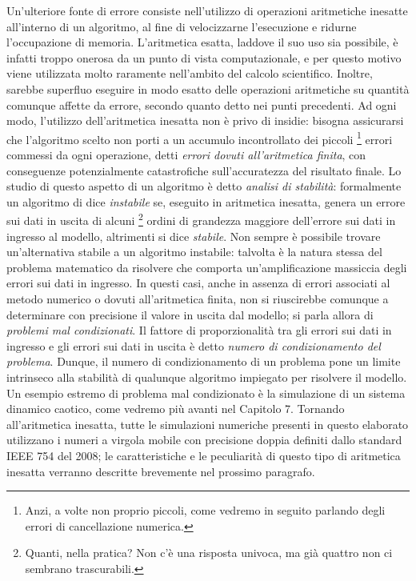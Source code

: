 Un'ulteriore fonte di errore consiste nell'utilizzo di operazioni
aritmetiche inesatte all'interno di un algoritmo, al fine di velocizzarne
l'esecuzione e ridurne l'occupazione di memoria.
L'aritmetica esatta, laddove il suo uso sia possibile,
è infatti troppo onerosa da un punto di vista computazionale,
e per questo motivo viene utilizzata molto raramente nell'ambito del calcolo scientifico.
Inoltre, sarebbe superfluo eseguire in modo esatto delle operazioni
aritmetiche su quantità comunque affette da errore,
secondo quanto detto nei punti precedenti. %
Ad ogni modo, l'utilizzo dell'aritmetica inesatta non è privo di insidie:
bisogna assicurarsi che l'algoritmo scelto
non porti a un accumulo incontrollato dei piccoli%
\footnote{Anzi, a volte non proprio piccoli, come vedremo in seguito
parlando degli errori di cancellazione numerica.}
errori commessi da ogni operazione, detti \emph{errori dovuti all'aritmetica finita},
con conseguenze potenzialmente catastrofiche sull'accuratezza del risultato finale.
Lo studio di questo aspetto di un algoritmo è detto \emph{analisi di stabilità}:
formalmente un algoritmo di dice \emph{instabile} se, eseguito in aritmetica
inesatta, genera un errore sui dati in uscita di alcuni%
\footnote{Quanti, nella pratica? Non c'è una risposta univoca,
ma già quattro non ci sembrano trascurabili.}
ordini di grandezza maggiore dell'errore sui dati in ingresso al modello,
altrimenti si dice \emph{stabile}.
Non sempre è possibile trovare un'alternativa stabile a un algoritmo instabile:
talvolta è la natura stessa del problema matematico da risolvere che comporta
un'amplificazione massiccia degli errori sui dati in ingresso.
In questi casi, anche in assenza di errori associati al metodo numerico
o dovuti all'aritmetica finita, non si riuscirebbe comunque 
a determinare con precisione il valore in uscita dal modello;
si parla allora di \emph{problemi mal condizionati}.
Il fattore di proporzionalità tra gli errori sui dati in ingresso e gli
errori sui dati in uscita è detto \emph{numero di condizionamento del problema}.
Dunque, il numero di condizionamento di un problema pone un limite intrinseco
alla stabilità di qualunque algoritmo impiegato per risolvere il modello.
Un esempio estremo di problema mal condizionato è la simulazione
di un sistema dinamico caotico, come vedremo più avanti nel Capitolo 7.
Tornando all'aritmetica inesatta,
%
%
tutte le simulazioni numeriche presenti in questo elaborato utilizzano
i numeri a virgola mobile con precisione doppia definiti dallo standard
IEEE 754 del 2008; le caratteristiche e le peculiarità di questo tipo
di aritmetica inesatta verranno descritte brevemente nel prossimo paragrafo.

